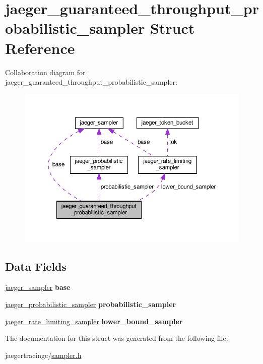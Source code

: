 \hypertarget{structjaeger__guaranteed__throughput__probabilistic__sampler}{}\section{jaeger\+\_\+guaranteed\+\_\+throughput\+\_\+probabilistic\+\_\+sampler Struct Reference}
\label{structjaeger__guaranteed__throughput__probabilistic__sampler}


Collaboration diagram for jaeger\+\_\+guaranteed\+\_\+throughput\+\_\+probabilistic\+\_\+sampler\+:\nopagebreak
\begin{figure}[H]
\begin{center}
\leavevmode
\includegraphics[width=350pt]{structjaeger__guaranteed__throughput__probabilistic__sampler__coll__graph}
\end{center}
\end{figure}
\subsection*{Data Fields}
\begin{DoxyCompactItemize}
\item 
\mbox{\label{structjaeger__guaranteed__throughput__probabilistic__sampler_a82d1383e728fd205b2b13c63314f2e43}} 
\mbox{\hyperlink{structjaeger__sampler}{jaeger\+\_\+sampler}} {\bfseries base}
\item 
\mbox{\label{structjaeger__guaranteed__throughput__probabilistic__sampler_afa54809aa0b0c6a4a5aad2e4314bd766}} 
\mbox{\hyperlink{structjaeger__probabilistic__sampler}{jaeger\+\_\+probabilistic\+\_\+sampler}} {\bfseries probabilistic\+\_\+sampler}
\item 
\mbox{\label{structjaeger__guaranteed__throughput__probabilistic__sampler_a80af8b3ac612320c6a00e4655e25f694}} 
\mbox{\hyperlink{structjaeger__rate__limiting__sampler}{jaeger\+\_\+rate\+\_\+limiting\+\_\+sampler}} {\bfseries lower\+\_\+bound\+\_\+sampler}
\end{DoxyCompactItemize}


The documentation for this struct was generated from the following file\+:\begin{DoxyCompactItemize}
\item 
jaegertracingc/\mbox{\hyperlink{sampler_8h}{sampler.\+h}}\end{DoxyCompactItemize}

